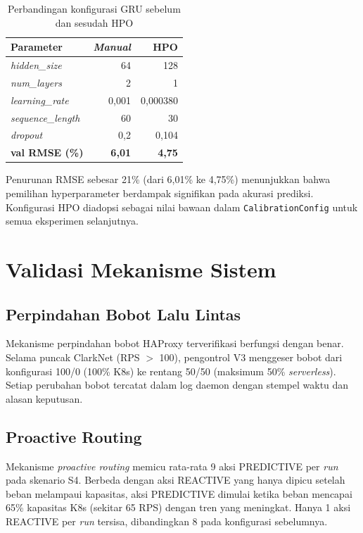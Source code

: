 \begin{table}[htbp]
    \centering
    \caption{Perbandingan konfigurasi GRU sebelum dan sesudah HPO}
    \label{tab:gru-hpo}
    \begin{tabular}{lrr}
        \toprule
        Parameter & \emph{Manual} & HPO \\
        \midrule
        \emph{hidden\_size} & 64 & 128 \\
        \emph{num\_layers} & 2 & 1 \\
        \emph{learning\_rate} & 0,001 & 0,000380 \\
        \emph{sequence\_length} & 60 & 30 \\
        \emph{dropout} & 0,2 & 0,104 \\
        \midrule
        \textbf{val RMSE (\%)} & \textbf{6,01} & \textbf{4,75} \\
        \bottomrule
    \end{tabular}
\end{table}

Penurunan RMSE sebesar 21\% (dari 6,01\% ke 4,75\%) menunjukkan bahwa pemilihan hyperparameter berdampak signifikan pada akurasi prediksi. Konfigurasi HPO diadopsi sebagai nilai bawaan dalam \texttt{CalibrationConfig} untuk semua eksperimen selanjutnya.

\section{Validasi Mekanisme Sistem}
\label{sec:mechanism-validation}

\subsection{Perpindahan Bobot Lalu Lintas}

Mekanisme perpindahan bobot HAProxy terverifikasi berfungsi dengan benar. Selama puncak ClarkNet (RPS $>$ 100), pengontrol V3 menggeser bobot dari konfigurasi 100/0 (100\% K8s) ke rentang 50/50 (maksimum 50\% \emph{serverless}). Setiap perubahan bobot tercatat dalam log daemon dengan stempel waktu dan alasan keputusan.

\subsection{Proactive Routing}

Mekanisme \emph{proactive routing} memicu rata-rata 9 aksi PREDICTIVE per \emph{run} pada skenario S4. Berbeda dengan aksi REACTIVE yang hanya dipicu setelah beban melampaui kapasitas, aksi PREDICTIVE dimulai ketika beban mencapai 65\% kapasitas K8s (sekitar 65 RPS) dengan tren yang meningkat. Hanya 1 aksi REACTIVE per \emph{run} tersisa, dibandingkan 8 pada konfigurasi sebelumnya.

